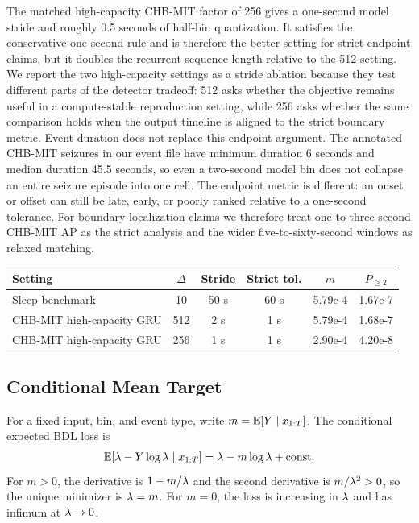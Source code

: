 The matched high-capacity CHB-MIT factor of 256 gives a one-second model stride
and roughly 0.5 seconds of half-bin quantization.
It satisfies the conservative one-second rule and is therefore the better
setting for strict endpoint claims, but it doubles the recurrent sequence length
relative to the 512 setting.
We report the two high-capacity settings as a stride ablation because they test
different parts of the detector tradeoff: 512 asks whether the objective remains
useful in a compute-stable reproduction setting, while 256 asks whether the
same comparison holds when the output timeline is aligned to the strict
boundary metric.
Event duration does not replace this endpoint argument.
The annotated CHB-MIT seizures in our event file have minimum duration
6 seconds and median duration 45.5 seconds, so even a two-second model bin does
not collapse an entire seizure episode into one cell.
The endpoint metric is different: an onset or offset can still be late, early,
or poorly ranked relative to a one-second tolerance.
For boundary-localization claims we therefore treat one-to-three-second
CHB-MIT AP as the strict analysis and the wider five-to-sixty-second windows as
relaxed matching.

\begin{center}
\centering
\label{tab:stride-heuristic}
\begin{tabular}{@{}lccccc@{}}
\toprule
Setting & $\Delta$ & Stride & Strict tol. & $m$ & $P_{\ge 2}$ \\
\midrule
Sleep benchmark & 10 & 50 s & 60 s & 5.79e-4 & 1.67e-7 \\
CHB-MIT high-capacity GRU & 512 & 2 s & 1 s & 5.79e-4 & 1.68e-7 \\
CHB-MIT high-capacity GRU & 256 & 1 s & 1 s & 2.90e-4 & 4.20e-8 \\
\bottomrule
\end{tabular}
\end{center}

\subsection{Conditional Mean Target}

For a fixed input, bin, and event type, write $m=\mathbb{E}[Y\mid x_{1:T}]$.
The conditional expected BDL loss is
\begin{align}
    \mathbb{E}[\lambda-Y\log\lambda\mid x_{1:T}]
    =
    \lambda - m\log\lambda + \mathrm{const}.
\end{align}
For $m>0$, the derivative is $1-m/\lambda$ and the second derivative is $m/\lambda^2>0$, so the unique minimizer is $\lambda=m$.
For $m=0$, the loss is increasing in $\lambda$ and has infimum at $\lambda\rightarrow0$.

